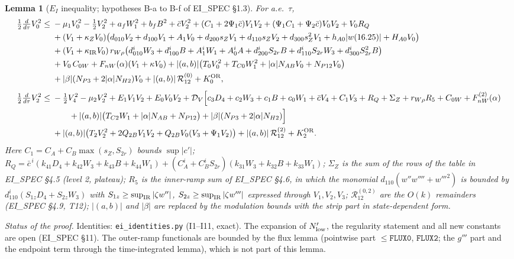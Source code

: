 \documentclass[11pt]{article}
\newtheorem{lemma}{Lemma}
\newcommand{\Dv}{\mathcal D_V}
\begin{document}
\begin{lemma}[$E_I$ inequality; hypotheses B-a to B-f of EI\_SPEC \S1.3]
For a.e.\ $\tau$,
\begin{align*}
\tfrac12\tfrac{d}{d\tau}V_0^2\le{}&-\mu_1V_0^2-\tfrac12V_2^2
+a_fW_1^2+b_fB^2
+\bar cV_2^2+(C_1+2\Psi_1\bar c)V_1V_2+(\Psi_1C_1+\Psi_2\bar c)V_0V_2+V_0R_Q\\
&+(V_1+\kappa_{Z}V_0)\bigl(d_{010}V_2+d_{100}V_1+A_1V_0+d_{200}s_ZV_1+d_{110}s_ZV_2+d_{300}s_Z^2V_1+h_{A0}|w(16.25)|+H_{A0}V_0\bigr)\\
&+(V_1+\kappa_{\rm IR}V_0)\,r_{W\rho}\bigl(d^{i}_{010}W_3+d^{i}_{100}B+A^{i}_1W_1+A^{i}_0A+d^{i}_{200}S_{2r}B+d^{i}_{110}S_{2r}W_3+d^{i}_{300}S_{2r}^2B\bigr)\\
&+V_0\,C_{0W}+F_{nW}(\alpha)(V_1+\kappa V_0)
+|(a,b)|\bigl(T_0V_0^2+T_{C0}W_1^2+|\alpha|N_{AB}V_0+N_{P12}V_0\bigr)\\
&+|\beta|(N_{P3}+2|\alpha|N_{H2})V_0+|(a,b)|\,\mathcal R_{12}^{(0)}+K_0^{\rm OR},\\[4pt]
\tfrac12\tfrac{d}{d\tau}V_2^2\le{}&-\tfrac12V_4^2-\mu_2V_2^2+E_1V_1V_2+E_0V_0V_2
+\Dv\Bigl[c_3D_4+c_2W_3+c_1B+c_0W_1+\bar cV_4+C_1V_3+R_Q+\Sigma_{Z}+r_{W\rho}R_5+C_{0W}+F^{(2)}_{nW}(\alpha)\\
&\qquad+|(a,b)|\bigl(T_{C2}W_1+|\alpha|N_{AB}+N_{P12}\bigr)+|\beta|(N_{P3}+2|\alpha|N_{H2})\Bigr]\\
&+|(a,b)|\bigl(T_2V_2^2+2Q_{2B}V_1V_2+Q_{2B}V_0(V_3+\Psi_1V_2)\bigr)+|(a,b)|\,\mathcal R_{12}^{(2)}+K_2^{\rm OR}.
\end{align*}
Here $C_1=C_A+C_B\max(s_Z,S_{2r})$ bounds $\sup|c'|$;
$R_Q=\bar c^{\,i}(k_{41}D_4+k_{42}W_3+k_{43}B+k_{44}W_1)+(C_A^i+C_B^iS_{2r})(k_{31}W_3+k_{32}B+k_{33}W_1)$;
$\Sigma_Z$ is the sum of the rows of the table in EI\_SPEC \S4.5 (level 2, plateau);
$R_5$ is the inner-ramp sum of EI\_SPEC \S4.6, in which the monomial $d_{110}(w''w''''+w'''^2)$ is bounded by
$d^i_{110}(S_{1z}D_4+S_{2z}W_3)$ with $S_{1z}\ge\sup_{\rm IR}|\zeta w''|$, $S_{2z}\ge\sup_{\rm IR}|\zeta w'''|$ expressed through $V_1,V_2,V_3$;
$\mathcal R_{12}^{(0,2)}$ are the $O(k)$ remainders (EI\_SPEC \S4.9, T12);
$|(a,b)|$ and $|\beta|$ are replaced by the modulation bounds with the strip part in state-dependent form.
\end{lemma}

\noindent\emph{Status of the proof.} Identities: \texttt{ei\_identities.py} (I1--I11, exact). The expansion of $N_{\rm low}'$,
the regularity statement and all new constants are open (EI\_SPEC \S11). The outer-ramp functionals are bounded by the flux
lemma (pointwise part $\le\mathtt{FLUX0}$, $\mathtt{FLUX2}$; the $g'''$ part and the endpoint term through the time-integrated lemma), which is
not part of this lemma.
\end{document}
